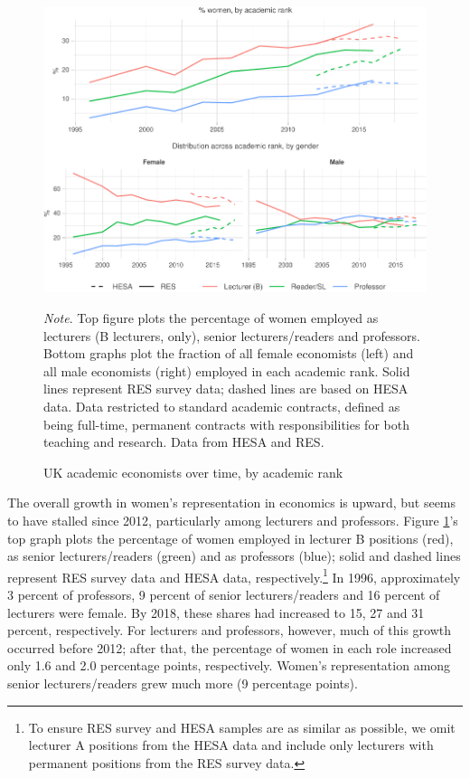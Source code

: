 \documentclass[a4paper, 1]{article}
\begin{document}
\begin{figure}
\centering
\includegraphics[width=\linewidth]{0-images/contract-1.pdf}

\caption{UK academic economists over time, by academic rank}
\label{fig:contract}
\justify\footnotesize\textit{Note}.  Top figure plots the percentage of women employed as lecturers (B lecturers, only), senior lecturers/readers and professors. Bottom graphs plot the fraction of all female economists (left) and all male economists (right) employed in each academic rank. Solid lines represent RES survey data; dashed lines are based on HESA data. Data restricted to standard academic contracts, defined as being full-time, permanent contracts with responsibilities for both teaching and research. Data from HESA and RES.
\end{figure}



The overall growth in women's representation in economics is upward, but seems to have stalled since 2012, particularly among lecturers and professors. Figure \ref{fig:contract}'s top graph plots the percentage of women employed in lecturer B positions (red), as senior lecturers/readers (green) and as professors (blue); solid and dashed lines represent RES survey data and HESA data, respectively.\footnote{\label{fn:lecA}To ensure RES survey and HESA samples are as similar as possible, we omit lecturer A positions from the HESA data and include only lecturers with permanent positions from the RES survey data.} In 1996, approximately 3 percent of professors, 9 percent of senior lecturers/readers and 16 percent of lecturers were female. By 2018, these shares had increased to 15, 27 and 31 percent, respectively. For lecturers and professors, however, much of this growth occurred before 2012; after that, the percentage of women in each role increased only 1.6 and 2.0 percentage points, respectively. Women's representation among senior lecturers/readers grew much more (9 percentage points).
\end{document}

